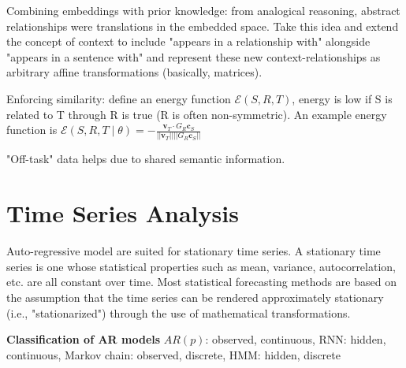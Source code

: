 \documentclass[11pt]{article}
\newcommand{\snorm}[1]{||#1||}
\newcommand{\given}{\mid}
\begin{document}
\par Combining embeddings with prior knowledge: from analogical reasoning, abstract relationships were translations in the embedded space. Take this idea and extend the concept of context to include "appears in a relationship with" alongside "appears in a sentence with" and represent these new context-relationships as arbitrary affine transformations (basically, matrices).
\par Enforcing similarity: define an energy function $\mathcal{E} (S,R,T)$, energy is low if S is related to T through R is true (R is often non-symmetric). An example  energy function is $\mathcal{E} (S,R,T \given \theta) = -\frac{\mathbf{v}_T \cdot G_R \mathbf{c}_S}{\snorm{\mathbf{v}_T}\snorm{G_R \mathbf{c}_S}}$
\par "Off-task" data helps due to shared semantic information.

\section{Time Series Analysis}
\par Auto-regressive model are suited for stationary time series. A stationary time series is one whose statistical properties such as mean, variance, autocorrelation, etc. are all constant over time. Most statistical forecasting methods are based on the assumption that the time series can be rendered approximately stationary (i.e., "stationarized") through the use of mathematical transformations.
\par \textbf{Classification of AR models} $AR(p)$: observed, continuous, RNN: hidden, continuous, Markov chain: observed, discrete, HMM: hidden, discrete
\end{document}

